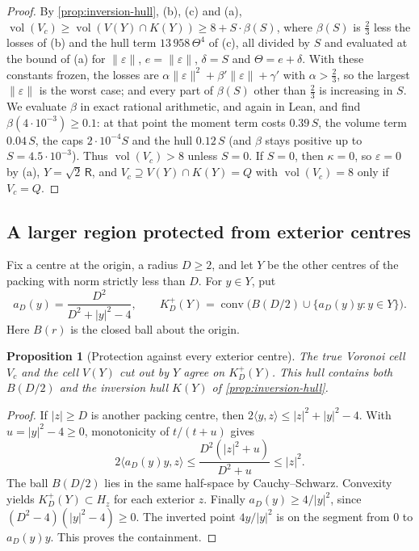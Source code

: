 \documentclass[11pt,reqno]{amsart}
\renewcommand{\_}{\origunderscore\allowbreak}
\numberwithin{equation}{section}
\theoremstyle{plain}
\newtheorem{prop}[thm]{Proposition}
\theoremstyle{definition}
\theoremstyle{remark}
\newcommand{\Rt}{\mathsf{R}}                 %
\DeclareMathOperator{\vol}{vol}
\begin{document}
\begin{proof}
By \cref{prop:inversion-hull}, (b), (c) and (a),
$\vol(V_c)\ge\vol(V(Y)\cap K(Y))\ge8+S\cdot\beta(S)$, where $\beta(S)$ is
$\frac23$ less the losses of (b) and the hull term $13\,958\,\Theta^4$ of (c),
all divided by $S$ and evaluated at the bound of (a) for $\|\varepsilon\|$, $e=\|\varepsilon\|$,
$\delta=S$ and $\Theta=e+\delta$. With these constants frozen, the losses are
$\alpha\|\varepsilon\|^2+\beta'\|\varepsilon\|+\gamma'$ with $\alpha>\frac23$, so the
largest $\|\varepsilon\|$ is the worst case; and every part of $\beta(S)$ other
than $\frac23$ is increasing in $S$. We evaluate
$\beta$ in exact rational arithmetic, and again in Lean, and find $\beta(4\cdot10^{-3})\ge0.1$:
at that point the moment term costs $0.39\,S$, the volume term $0.04\,S$,
the caps $2\cdot10^{-4}S$ and the hull $0.12\,S$ (and $\beta$ stays positive up to
$S=4.5\cdot10^{-3}$). Thus $\vol(V_c)>8$ unless $S=0$. If $S=0$, then $\kappa=0$, so $\varepsilon=0$ by
(a), $Y=\sqrt2\,\Rt$, and $V_c\supseteq V(Y)\cap K(Y)=Q$ with
$\vol(V_c)=8$ only if $V_c=Q$.
\end{proof}

\subsection{A larger region protected from exterior centres}
\label{sec:protected-shell}

Fix a centre at the origin, a radius $D\ge2$, and let $Y$ be the
other centres of the packing with norm strictly less than $D$.
For $y\in Y$, put
\[
 a_D(y)=\frac{D^2}{D^2+|y|^2-4},\qquad
 K_D^+(Y)=\operatorname{conv}\bigl(B(D/2)\cup
                       \{a_D(y)y:y\in Y\}\bigr).
\]
Here $B(r)$ is the closed ball about the origin.

\begin{prop}[Protection against every exterior centre]\label{prop:protected-shell}
The true Voronoi cell $V_c$ and the cell $V(Y)$ cut out by $Y$
agree on $K_D^+(Y)$. This hull contains both $B(D/2)$ and the
inversion hull $K(Y)$ of \cref{prop:inversion-hull}.
\end{prop}
\begin{proof}
If $|z|\ge D$ is another packing centre, then
$2\langle y,z\rangle\le |z|^2+|y|^2-4$. With $u=|y|^2-4\ge0$,
monotonicity of $t/(t+u)$ gives
\[
 2\langle a_D(y)y,z\rangle
 \le\frac{D^2(|z|^2+u)}{D^2+u}\le |z|^2.
\]
The ball $B(D/2)$ lies in the same half-space by Cauchy--Schwarz.
Convexity yields $K_D^+(Y)\subset H_z$ for each exterior $z$.
Finally $a_D(y)\ge4/|y|^2$, since $(D^2-4)(|y|^2-4)\ge0$.
The inverted point $4y/|y|^2$ is on the segment from $0$ to
$a_D(y)y$. This proves the containment.
\end{proof}
\end{document}
